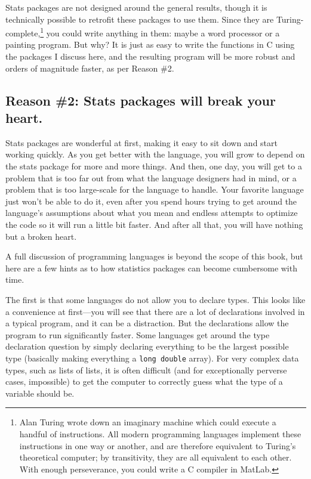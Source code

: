 Stats packages are not designed around the general results, though
it is technically possible to retrofit these packages to use them. Since
they are Turing-complete,\footnote{Alan Turing wrote down an imaginary
machine which could execute a handful of instructions.  All
modern programming languages implement these instructions in one way or
another, and are therefore equivalent to Turing's theoretical computer;
by transitivity, they are all equivalent to each other. With enough
perseverance, you could
write a C compiler in MatLab.} you could
write anything in them: maybe a word processor or a painting program. But
why? It is just as easy to write the functions in C using the packages I discuss
here, and the resulting program will be more robust and orders of
magnitude faster, as per Reason \#2.
	\fi

\subsection{Reason \#2: Stats packages will break your heart.} Stats packages
are wonderful at first, making it easy to sit down and start working
quickly. As you get better with the language, you will 
grow to depend on the stats package for more and more
things. And then, one day, you will get to a problem that is too far
out from what the language designers had in mind, or a problem that is
too large-scale for the language to handle. Your favorite language just
won't be able to do it, even after you spend hours trying to get around
the language's assumptions about what you mean and endless attempts to
optimize the code so it will run a little bit faster. And after all that,
you will have nothing but a broken heart.

A full discussion of programming languages is beyond the scope of this book, but
here are a few hints as to how statistics packages can become cumbersome with
time. 

The first is that some languages do not allow you to declare types. This
looks like a convenience at first---you will see that there are a
lot of declarations involved in a typical program, and it can be a
distraction. But the declarations allow the program to run significantly
faster. Some languages get around the type declaration question by simply
declaring everything to be the largest possible type (basically making
everything a {\tt long double} array).  For very complex data types,
such as lists of lists, it is often difficult (and for exceptionally
perverse cases, impossible) to get the computer to correctly guess what the
type of a variable should be.

